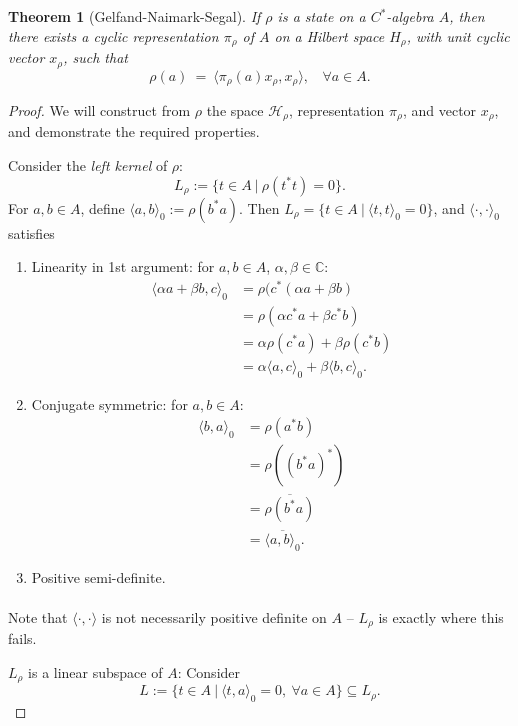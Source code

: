 \documentclass[12pt,a4paper]{amsart}
\theoremstyle{plain}
\newtheorem{thm}{Theorem}
\theoremstyle{definition}
\newcommand{\Hr}{\mathcal{H}_\rho}
\newcommand{\1}{\mathbbm{1}}
\begin{document}
\begin{thm} [Gelfand-Naimark-Segal]
	If $\rho$ is a state on a $C^\ast$-algebra $A$, then there exists a cyclic representation 
	$\pi_\rho$ of $A$ on a Hilbert space ${H}_\rho$, with unit cyclic vector $x_\rho$, such that 
	\[ 
		\rho(a)~=~ \langle \pi_\rho (a) x_\rho, x_\rho \rangle, ~~~~ \forall a \in A.
	\]
\end{thm}
\begin{proof}
	We will construct from $\rho$ the space $\Hr$,  representation $\pi_\rho$, 
	and vector $x_\rho$, and demonstrate the required properties.
	
	Consider the \emph{left kernel} of $\rho$:
	\[
		L_\rho := \{t \in A ~|~ \rho (t ^\ast t) = 0 \}.
	\]	
	For $a,b \in A$, define $\langle a , b \rangle_0 := \rho(b^\ast a)$.
	Then $L_\rho = \{t\in A ~|~ \langle t , t \rangle _0 = 0 \} $, and 
	$\langle \cdot, \cdot \rangle_0$ satisfies
	\begin{enumerate}[label=(\roman*)]
	  \item Linearity in 1st argument: for $a,b\in A$, $\alpha, \beta \in \mathbb{C}$:
		\begin{align*}
		   \langle \alpha a + \beta b, c \rangle_0 
		&= \rho (c^\ast(\alpha a + \beta b)   								\\
		&= \rho (\alpha c^\ast a + \beta c^\ast b)  						\\
		&= \alpha \rho (c^\ast a) + \beta \rho (c^\ast b)					\\
		&= \alpha \langle a , c \rangle_0 + \beta \langle b, c \rangle_0.
		\end{align*}
	  \item Conjugate symmetric: for $a,b \in A$:
	  	\begin{align*}
	  	   \langle b,a \rangle _0 
	  	&= \rho (a^\ast b)													\\
	  	&= \rho ((b^\ast a)^\ast)											\\
	  	&= \overline{\rho (b^\ast a)}										\\
	  	&= \overline{\langle a,b \rangle _0 }.
	  	\end{align*}
	  \item Positive semi-definite.  %
	  	\begin{align*}
	  	\end{align*}
	\end{enumerate}
	Note that $\langle \cdot, \cdot \rangle$ is not necessarily positive definite on 
	$A$ -- $L_\rho$ is exactly where this fails.
	
	$L_\rho$ is  a linear subspace of $A$: Consider  %
	\[
		L:= \{t \in A  ~|~ \langle t,a \rangle _0 = 0, ~\forall a \in A \}\subseteq L_\rho.
	\]
	

\end{proof}
\end{document}
